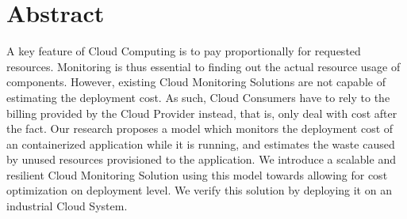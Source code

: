 \begingroup
\let\clearpage\relax
\let\cleardoublepage\relax
\let\cleardoublepage\relax

\chapter*{Abstract}
A key feature of Cloud Computing is to pay proportionally for requested resources. Monitoring is thus essential to finding out the actual resource usage of components. However, existing Cloud Monitoring Solutions are not capable of estimating the deployment cost.
As such, Cloud Consumers have to rely to the billing provided by the Cloud Provider instead, that is, only deal with cost after the fact.
Our research proposes a model which monitors the deployment cost of an containerized application while it is running, and estimates the waste caused by unused resources provisioned to the application. 
We introduce a scalable and resilient Cloud Monitoring Solution using this model towards allowing for cost optimization on deployment level. We verify this solution by deploying it on an industrial Cloud System.
\vfill

\endgroup

\vfill
